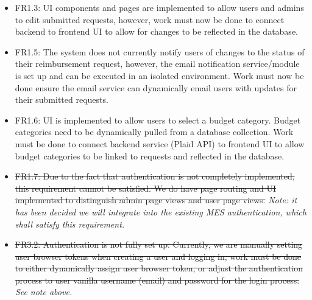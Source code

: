 \documentclass[12pt, titlepage]{article}
\begin{document}
\begin{itemize}
    \item FR1.3: UI components and pages are implemented to allow users and admins to edit submitted requests, however, work must now be done to connect backend to frontend UI to allow for changes to be reflected in the database.
    \item FR1.5: The system does not currently notify users of changes to the status of their reimbursement request, however, the email notification service/module is set up and can be executed in an isolated environment. Work must now be done ensure the email service can dynamically email users with updates for their submitted requests.
    \item FR1.6: UI is implemented to allow users to select a budget category. Budget categories need to be dynamically pulled from a database collection. Work must be done to connect backend service (Plaid API) to frontend UI to allow budget categories to be linked to requests and reflected in the database.
    \item \st{FR1.7: Due to the fact that authentication is not completely implemented, this requirement cannot be satisfied. We do have page routing and UI implemented to distinguish admin page views and user page views.} \textit{Note: it has been decided we will integrate into the existing MES authentication, which shall satisfy this requirement.}
    \item \st{FR3.2: Authentication is not fully set up. Currently, we are manually setting user browser tokens when creating a user and logging in, work must be done to either dynamically assign user browser token, or adjust the authentication process to user vanilla username (email) and password for the login process.} \textit{See note above.}
\end{itemize}
\end{document}

